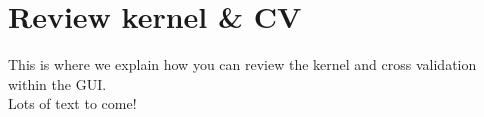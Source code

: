 
\chapter{Review kernel \& CV}
\minitoc

This is where we explain how you can review the kernel and cross validation within the GUI. \\
Lots of text to come!